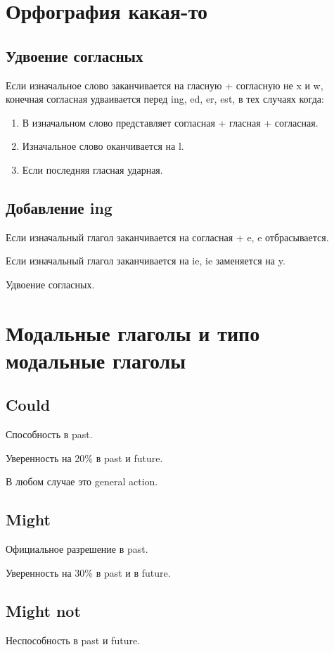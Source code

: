 \documentclass[oneside]{book}
\begin{document}
\chapter{Орфография какая-то}
\section{Удвоение согласных}
Если изначальное слово заканчивается на гласную + согласную не x и w, конечная
согласная удваивается перед ing, ed, er, est,
в тех случаях когда:
\begin{enumerate}
    \item В изначальном слово представляет согласная + гласная + согласная.
    \item Изначальное слово оканчивается на l.
    \item Если последняя гласная ударная.
\end{enumerate}

\section{Добавление ing}
Если изначальный глагол заканчивается на согласная + e, e отбрасывается.

Если изначальный глагол заканчивается на ie, ie заменяется на y.

Удвоение согласных.

\chapter{Модальные глаголы и типо модальные глаголы}
\section{Could}
Способность в past.

Уверенность на 20\% в past и future.

В любом случае это general action.

\section{Might}
Официальное разрешение в past.

Уверенность на 30\% в past и в future.

\section{Might not}
Неспособность в past и future.
\end{document}

